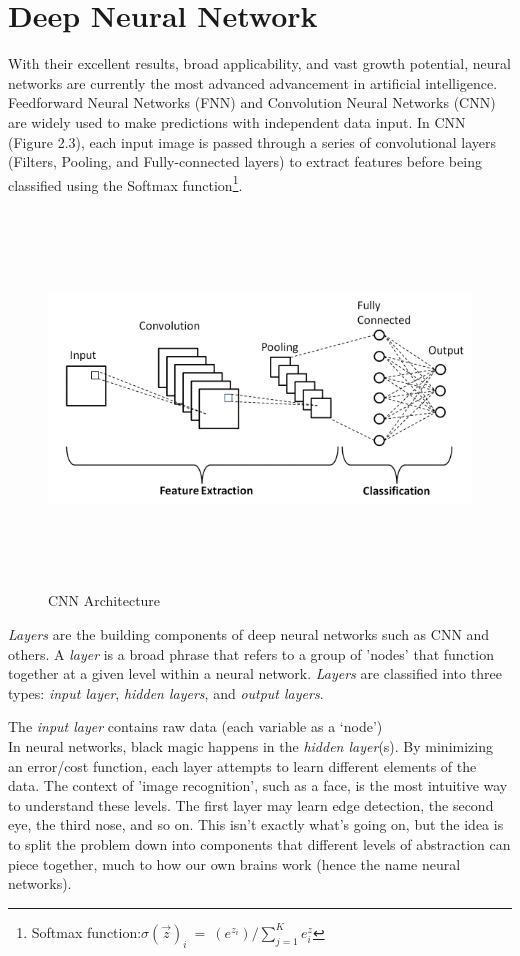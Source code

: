 \section{Deep Neural Network}
\label{sec:deep_neural_network}
With their excellent results, broad applicability, and vast growth potential, neural networks are currently the most advanced advancement in artificial intelligence.
Feedforward Neural Networks (FNN) and Convolution Neural Networks (CNN) are widely used to make predictions with independent data input. In CNN (Figure 2.3), each input image is passed through a series of convolutional layers (Filters, Pooling, and Fully-connected layers) to extract features before being classified using the Softmax function\footnote{Softmax function:$ \sigma (\overrightarrow{z})_i \: = \: (e^{z_i})/ \sum_{j=1}^{K} e^z_i  $}.
\begin{figure}[h!]
	\centering
	\includegraphics[width=\linewidth, height=10cm,keepaspectratio]{figures/CNN.png}
	\caption{CNN Architecture}
\end{figure}	

\emph{Layers} are the building components of deep neural networks such as CNN and others. A \emph{layer} is a broad phrase that refers to a group of 'nodes' that function together at a given level within a neural network. \emph{Layers} are classified into three types: \emph{input layer},\emph{ hidden layers}, and \emph{output layers}.

The \emph{input layer} contains raw data (each variable as a ‘node’) \\
In neural networks, black magic happens in the \emph{hidden layer}(s). By minimizing an error/cost function, each layer attempts to learn different elements of the data. The context of 'image recognition', such as a face, is the most intuitive way to understand these levels. The first layer may learn edge detection, the second eye, the third nose, and so on. This isn't exactly what's going on, but the idea is to split the problem down into components that different levels of abstraction can piece together, much to how our own brains work (hence the name neural networks).

